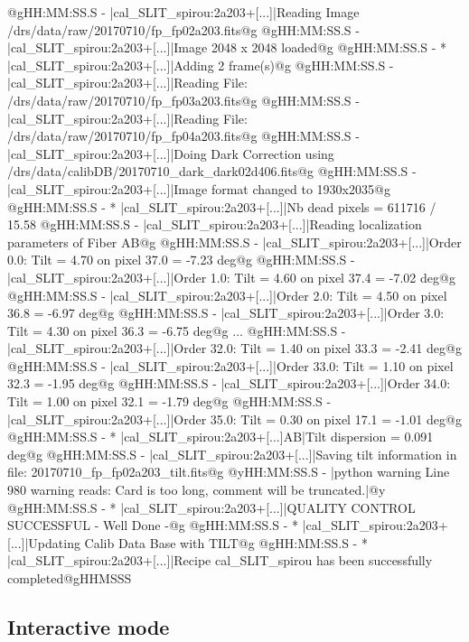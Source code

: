 \begin{cmdboxprintspecial}[fontupper=\tiny, fontlower=\tiny]
@gHH:MM:SS.S -   |cal_SLIT_spirou:2a203+[...]|Reading Image /drs/data/raw/20170710/fp_fp02a203.fits@g
@gHH:MM:SS.S -   |cal_SLIT_spirou:2a203+[...]|Image 2048 x 2048 loaded@g
@gHH:MM:SS.S - * |cal_SLIT_spirou:2a203+[...]|Adding 2 frame(s)@g
@gHH:MM:SS.S -   |cal_SLIT_spirou:2a203+[...]|Reading File: /drs/data/raw/20170710/fp_fp03a203.fits@g
@gHH:MM:SS.S -   |cal_SLIT_spirou:2a203+[...]|Reading File: /drs/data/raw/20170710/fp_fp04a203.fits@g
@gHH:MM:SS.S -   |cal_SLIT_spirou:2a203+[...]|Doing Dark Correction using /drs/data/calibDB/20170710_dark_dark02d406.fits@g
@gHH:MM:SS.S -   |cal_SLIT_spirou:2a203+[...]|Image format changed to 1930x2035@g
@gHH:MM:SS.S - * |cal_SLIT_spirou:2a203+[...]|Nb dead pixels = 611716 / 15.58 %
@gHH:MM:SS.S -   |cal_SLIT_spirou:2a203+[...]|Reading localization parameters of Fiber AB@g
@gHH:MM:SS.S -   |cal_SLIT_spirou:2a203+[...]|Order 0.0: Tilt = 4.70 on pixel 37.0 = -7.23 deg@g
@gHH:MM:SS.S -   |cal_SLIT_spirou:2a203+[...]|Order 1.0: Tilt = 4.60 on pixel 37.4 = -7.02 deg@g
@gHH:MM:SS.S -   |cal_SLIT_spirou:2a203+[...]|Order 2.0: Tilt = 4.50 on pixel 36.8 = -6.97 deg@g
@gHH:MM:SS.S -   |cal_SLIT_spirou:2a203+[...]|Order 3.0: Tilt = 4.30 on pixel 36.3 = -6.75 deg@g
...
@gHH:MM:SS.S -   |cal_SLIT_spirou:2a203+[...]|Order 32.0: Tilt = 1.40 on pixel 33.3 = -2.41 deg@g
@gHH:MM:SS.S -   |cal_SLIT_spirou:2a203+[...]|Order 33.0: Tilt = 1.10 on pixel 32.3 = -1.95 deg@g
@gHH:MM:SS.S -   |cal_SLIT_spirou:2a203+[...]|Order 34.0: Tilt = 1.00 on pixel 32.1 = -1.79 deg@g
@gHH:MM:SS.S -   |cal_SLIT_spirou:2a203+[...]|Order 35.0: Tilt = 0.30 on pixel 17.1 = -1.01 deg@g
@gHH:MM:SS.S - * |cal_SLIT_spirou:2a203+[...]AB|Tilt dispersion = 0.091 deg@g
@gHH:MM:SS.S -   |cal_SLIT_spirou:2a203+[...]|Saving tilt  information in file: 20170710_fp_fp02a203_tilt.fits@g
@yHH:MM:SS.S - \@ |python warning Line 980  warning reads: Card is too long, comment will be truncated.|@y
@gHH:MM:SS.S - * |cal_SLIT_spirou:2a203+[...]|QUALITY CONTROL SUCCESSFUL - Well Done -@g
@gHH:MM:SS.S - * |cal_SLIT_spirou:2a203+[...]|Updating Calib Data Base with TILT@g
@gHH:MM:SS.S - * |cal_SLIT_spirou:2a203+[...]|Recipe cal_SLIT_spirou has been successfully completed@gHHMSSS
\end{cmdboxprintspecial}

\newpage
\subsection{Interactive mode}

